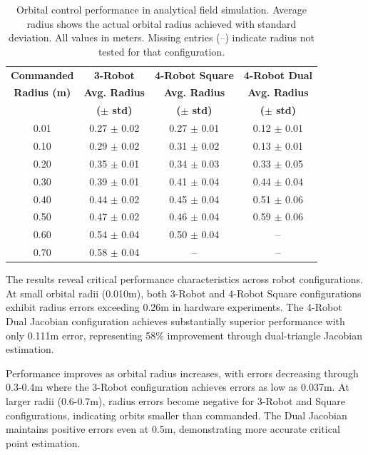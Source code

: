 \documentclass[lettersize,journal]{IEEEtran}
\begin{document}
\begin{table}[h]
\centering
\begin{tabular}{cccc}
\hline
\textbf{Commanded} & \textbf{3-Robot} & \textbf{4-Robot Square} & \textbf{4-Robot Dual} \\
\textbf{Radius (m)} & \textbf{Avg. Radius} & \textbf{Avg. Radius} & \textbf{Avg. Radius} \\
 & \textbf{($\pm$ std)} & \textbf{($\pm$ std)} & \textbf{($\pm$ std)} \\
\hline
0.01 & 0.27 $\pm$ 0.02 & 0.27 $\pm$ 0.01 & 0.12 $\pm$ 0.01 \\
0.10 & 0.29 $\pm$ 0.02 & 0.31 $\pm$ 0.02 & 0.13 $\pm$ 0.01 \\
0.20 & 0.35 $\pm$ 0.01 & 0.34 $\pm$ 0.03 & 0.33 $\pm$ 0.05 \\
0.30 & 0.39 $\pm$ 0.01 & 0.41 $\pm$ 0.04 & 0.44 $\pm$ 0.04 \\
0.40 & 0.44 $\pm$ 0.02 & 0.45 $\pm$ 0.04 & 0.51 $\pm$ 0.06 \\
0.50 & 0.47 $\pm$ 0.02 & 0.46 $\pm$ 0.04 & 0.59 $\pm$ 0.06 \\
0.60 & 0.54 $\pm$ 0.04 & 0.50 $\pm$ 0.04 & -- \\
0.70 & 0.58 $\pm$ 0.04 & -- & -- \\
\hline
\end{tabular}
\caption{Orbital control performance in analytical field simulation. Average radius shows the actual orbital radius achieved with standard deviation. All values in meters. Missing entries (--) indicate radius not tested for that configuration.}
\label{tab:orbital_radius_comparison}
\end{table}

The results reveal critical performance characteristics across robot configurations. At small orbital radii (0.010m), both 3-Robot and 4-Robot Square configurations exhibit radius errors exceeding 0.26m in hardware experiments. The 4-Robot Dual Jacobian configuration achieves substantially superior performance with only 0.111m error, representing 58\% improvement through dual-triangle Jacobian estimation.

Performance improves as orbital radius increases, with errors decreasing through 0.3-0.4m where the 3-Robot configuration achieves errors as low as 0.037m. At larger radii (0.6-0.7m), radius errors become negative for 3-Robot and Square configurations, indicating orbits smaller than commanded. The Dual Jacobian maintains positive errors even at 0.5m, demonstrating more accurate critical point estimation.
\end{document}
